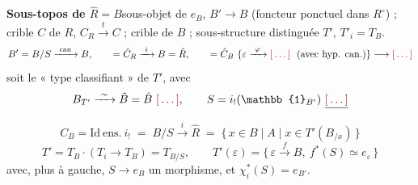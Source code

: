\documentclass[11pt,a4paper]{article}
\begin{document}
\textbf{Sous-topos  de $\hat{R} = B$}\quad sous-objet \ill{} de
$e_{B}$, $B' \to B$ (foncteur ponctuel dans $R^{\circ}$) ; crible $C$ de $R$,
$C_{R} \xrightarrow{\ t\ } C$ ; crible  de $B$ ; sous-structure
distinguée $T'$, $T'_{i} = T_{B}$.
\[
  B' = B/S \xrightarrow{\ \mathrm{can}\ } B, \qquad
  = \hat{C}_{R} \xrightarrow{\ i\ } B = \hat{R}, \qquad
  = \hat{C}_{B}\ \{\varepsilon \xrightarrow{\ \varphi\ } \ill{}\ \text{
    (avec hyp. can.)} \} \longrightarrow \ill{}
\]
soit le « type classifiant » de $T'$, avec
\[
  B_{T'} \xrightarrow{\ \sim\ } \tilde{B} = \hat{B}\ \ill{} , \qquad
  S = i_{!}(\mathbb{1}_{B'}) \ \struck{\ill{}}
\]
\[
  C_{B} = \mathrm{Id}\ \text{ens.}\ i_{!}
  \;=\; B/S \xrightarrow{\ i\ } \hat{R}
  \;=\; \{\, x \in B \mid A \mid x \in T'(B_{/x}) \,\}
\]
\[
  T' = T_{B} \cdot (T_{i} \to T_{B}) = T_{B/S}, \qquad
  T'(\varepsilon) = \{\, \varepsilon \xrightarrow{\ f\ } B,\ f^{*}(S) \simeq
    e_{\varepsilon} \,\}
\]
avec, plus à gauche, $S \to e_{B}$ un \ill{}morphisme, et
$\chi_{i}^{*}(S) = e_{B'}$.

\end{document}
